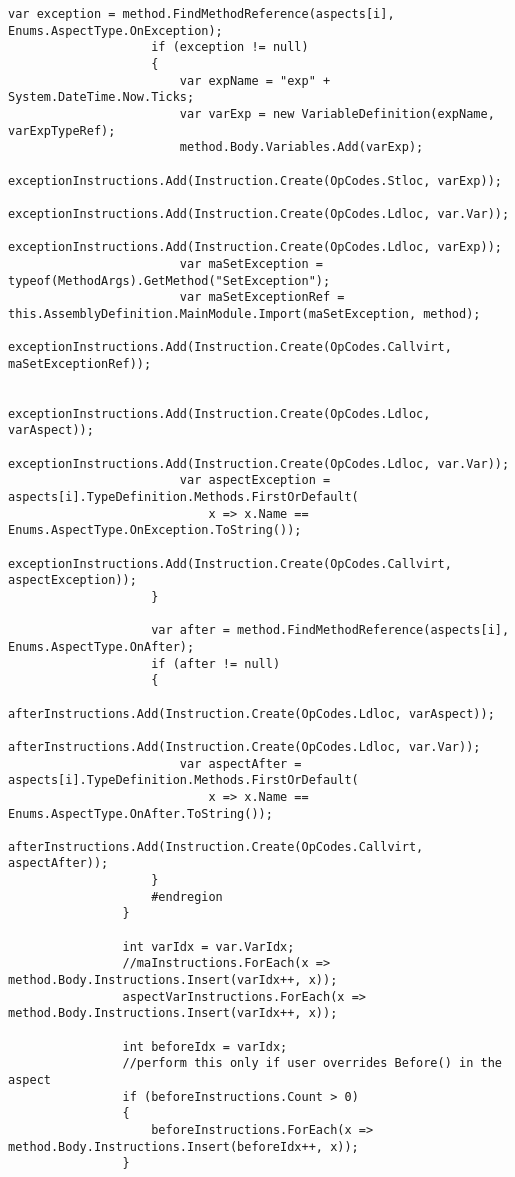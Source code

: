 \begin{lstlisting}[caption={../buffalo/Injectors/MethodBoundaryInjector.cs}, label=../buffalo/Injectors/MethodBoundaryInjector.cs, frame=tb, basicstyle=\scriptsize]
                    var exception = method.FindMethodReference(aspects[i], Enums.AspectType.OnException);
                    if (exception != null)
                    {
                        var expName = "exp" + System.DateTime.Now.Ticks;
                        var varExp = new VariableDefinition(expName, varExpTypeRef);
                        method.Body.Variables.Add(varExp);
                        exceptionInstructions.Add(Instruction.Create(OpCodes.Stloc, varExp));
                        exceptionInstructions.Add(Instruction.Create(OpCodes.Ldloc, var.Var));
                        exceptionInstructions.Add(Instruction.Create(OpCodes.Ldloc, varExp));
                        var maSetException = typeof(MethodArgs).GetMethod("SetException");
                        var maSetExceptionRef = this.AssemblyDefinition.MainModule.Import(maSetException, method);
                        exceptionInstructions.Add(Instruction.Create(OpCodes.Callvirt, maSetExceptionRef));

                        exceptionInstructions.Add(Instruction.Create(OpCodes.Ldloc, varAspect));
                        exceptionInstructions.Add(Instruction.Create(OpCodes.Ldloc, var.Var));
                        var aspectException = aspects[i].TypeDefinition.Methods.FirstOrDefault(
                            x => x.Name == Enums.AspectType.OnException.ToString());
                        exceptionInstructions.Add(Instruction.Create(OpCodes.Callvirt, aspectException));
                    }

                    var after = method.FindMethodReference(aspects[i], Enums.AspectType.OnAfter);
                    if (after != null)
                    {
                        afterInstructions.Add(Instruction.Create(OpCodes.Ldloc, varAspect));
                        afterInstructions.Add(Instruction.Create(OpCodes.Ldloc, var.Var));
                        var aspectAfter = aspects[i].TypeDefinition.Methods.FirstOrDefault(
                            x => x.Name == Enums.AspectType.OnAfter.ToString());
                        afterInstructions.Add(Instruction.Create(OpCodes.Callvirt, aspectAfter));
                    }
                    #endregion
                }

                int varIdx = var.VarIdx;
                //maInstructions.ForEach(x => method.Body.Instructions.Insert(varIdx++, x));
                aspectVarInstructions.ForEach(x => method.Body.Instructions.Insert(varIdx++, x));

                int beforeIdx = varIdx;
                //perform this only if user overrides Before() in the aspect
                if (beforeInstructions.Count > 0)
                {
                    beforeInstructions.ForEach(x => method.Body.Instructions.Insert(beforeIdx++, x));
                }


\end{lstlisting}
